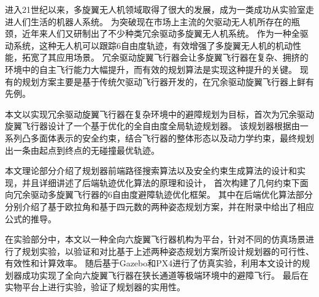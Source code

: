 \begin{cabstract}
  进入21世纪以来，多旋翼无人机领域取得了很大的发展，成为一类成功从实验室走进人们生活的机器人系统。
  为突破现在市场上主流的欠驱动无人机所存在的瓶颈，近年来人们又研制出了不少种类冗余驱动多旋翼无人机系统。
  作为一种全驱动系统，这种无人机可以跟踪6自由度轨迹，有效增强了多旋翼无人机的机动性能，拓宽了其应用场景。
  冗余驱动旋翼飞行器会让多旋翼飞行器在复杂、拥挤的环境中的自主飞行能力大幅提升，而有效的规划算法是实现这种提升的关键。
  现有的规划方案主要是基于传统欠驱动飞行器开发的，在冗余驱动旋翼飞行器上鲜有先例。

  本文以实现冗余驱动旋翼飞行器在复杂环境中的避障规划为目标，首次为冗余驱动旋翼飞行器设计了一个基于优化的全自由度全局轨迹规划器。
  该规划器根据由一系列凸多面体表示的安全约束，结合飞行器的整体形态以及动力学约束，最终规划出一条由起点到终点的无碰撞最优轨迹。

  本文理论部分介绍了规划器前端路径搜索算法以及安全约束生成算法的设计和实现，并且详细讲述了后端轨迹优化算法的原理和设计，
  首次构建了几何约束下面向冗余驱动多旋翼飞行器的6自由度避障轨迹优化框架。
  其中在后端优化算法部分分别介绍了基于欧拉角和基于四元数的两种姿态规划方案，并在附录中给出了相应公式的推导。

  在实验部分中，本文以一种全向六旋翼飞行器机构为平台，针对不同的仿真场景进行了规划实验，以验证和对比基于上述两种姿态规划方案所设计规划器的可行性、有效性和计算效率。
  随后基于Gazebo和PX4进行了仿真实验，利用本文设计的规划器成功实现了全向六旋翼飞行器在狭长通道等极端环境中的避障飞行。
  最后在实物平台上进行实验，验证了规划器的实用性。



\end{cabstract}

